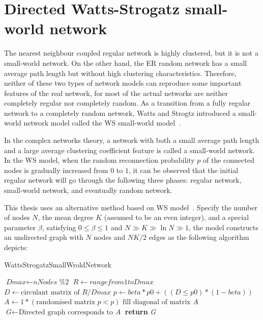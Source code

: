 \section{Directed Watts-Strogatz small-world network}
The nearest neighbour coupled regular network is highly clustered, but it is not a small-world network. On the other hand, the ER random network has a small average path length but without high clustering characteristics. Therefore, neither of these two types of network models can reproduce some important features of the real network, for most of the actual networks are neither completely regular nor completely random. As a transition from a fully regular network to a completely random network, Watts and Strogtz introduced a small-world network model called the WS small-world model~\cite{watts1998collective}.


In the complex networks theory, a network with both a small average path length and a large average clustering coefficient feature is called a small-world network. In the WS model, when the random reconnection probability $p$ of the connected nodes is gradually increased from $0$ to $1$, it can be observed that the initial regular network will go through the following three phases: regular network, small-world network, and eventually random network.

This thesis uses an alternative method based on WS model~\cite{song2014simple}. Specify the number of nodes $N$, the mean degree $K$ (assumed to be an even integer), and a special parameter $\beta$, satisfying $0\leq \beta \leq 1$ and $N\gg K\gg \ln N\gg 1$, the model constructs an undirected graph with $N$ nodes and ${NK}/{2}$ edges as the following algorithm depicts:

\begin{algorithm}[H]
	\caption{WattsStrogatzSmallWroldNetwork}\label{alg:smallworld}
	\begin{algorithmic}[1]
		\State $\textit{Dmax} \gets \textit{nNodes \% 2}$
		\State $\textit{R} \gets range from 1 to \textit{Dmax}$
		\State $\textit{D} \gets \text{circulant matrix of } \textit{R}/\textit{Dmax}$
		\State $\textit{p} \gets \textit{beta}*\textit{p0}+((\textit{D} \leq \textit{p0})*(1-\textit{beta}))$
		\State $\textit{A} \gets 1*(\text{randomised matrix }\textit{p} < p)$
		\State $\text{fill diagonal of matrix }\textit{A}$
		\State $\textit{G} \gets \text{Directed graph corresponds to }\textit{A}$
		\State \textbf{return} {\textit{G}}
		\EndProcedure
	\end{algorithmic}
\end{algorithm}

